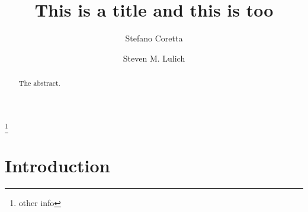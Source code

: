 \documentclass[preprint]{JASAnew}
\begin{document}

\title[A subtitle goes on another line]{This is a title and this is too}



\author{Stefano Coretta}
\thanks{other info}
\author{Steven M. Lulich}







\begin{abstract}
The abstract.
\end{abstract}


\maketitle




\section{Introduction}\label{introduction}
\end{document}
